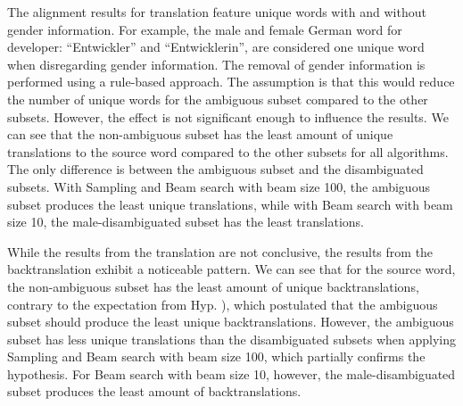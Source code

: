 The alignment results for translation feature unique words with and without gender information. For example, the male and female German word for developer: “Entwickler” and “Entwicklerin”, are considered one unique word when disregarding gender information. The removal of gender information is performed using a rule-based approach. The assumption is that this would reduce the number of unique words for the ambiguous subset compared to the other subsets. However, the effect is not significant enough to influence the results. We can see that the non-ambiguous subset has the least amount of unique translations to the source word compared to the other subsets for all algorithms. The only difference is between the ambiguous subset and the disambiguated subsets. With Sampling and Beam search with beam size 100, the ambiguous subset produces the least unique translations, while with Beam search with beam size 10, the male-disambiguated subset has the least translations.

While the results from the translation are not conclusive, the results from the backtranslation exhibit a noticeable pattern. We can see that for the source word, the non-ambiguous subset has the least amount of unique backtranslations, contrary to the expectation from Hyp. ), which postulated that the ambiguous subset should produce the least unique backtranslations. However, the ambiguous subset has less unique translations than the disambiguated subsets when applying Sampling and Beam search with beam size 100, which partially confirms the hypothesis. For Beam search with beam size 10, however, the male-disambiguated subset produces the least amount of backtranslations.

